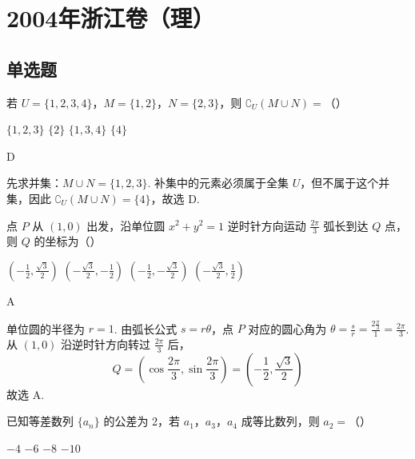 \chapter{2004年浙江卷（理）}
\section{单选题}
\begin{problem}
若 \(U=\{1,2,3,4\}\)，\(M=\{1,2\}\)，\(N=\{2,3\}\)，则 \(\complement_U(M\cup N)=\)（\quad）

\choices
    {\(\{1,2,3\}\)}
    {\(\{2\}\)}
    {\(\{1,3,4\}\)}
    {\(\{4\}\)}
\end{problem}

\begin{answer}
D
\end{answer}

\begin{solution}
先求并集：\(M\cup N=\{1,2,3\}\). 补集中的元素必须属于全集 \(U\)，但不属于这个并集，因此
\(\complement_U(M\cup N)=\{4\}\)，故选 D.
\end{solution}

\begin{problem}
点 \(P\) 从 \((1,0)\) 出发，沿单位圆 \(x^2+y^2=1\) 逆时针方向运动 \(\frac{2\pi}{3}\) 弧长到达 \(Q\) 点，则 \(Q\) 的坐标为（\quad）

\choices
    {\(\left(-\frac{1}{2}, \frac{\sqrt{3}}{2}\right)\)}
    {\(\left(-\frac{\sqrt{3}}{2}, -\frac{1}{2}\right)\)}
    {\(\left(-\frac{1}{2}, -\frac{\sqrt{3}}{2}\right)\)}
    {\(\left(-\frac{\sqrt{3}}{2}, \frac{1}{2}\right)\)}
\end{problem}

\begin{answer}
A
\end{answer}

\begin{solution}
单位圆的半径为 \(r=1\). 由弧长公式 \(s=r\theta\)，点 \(P\) 对应的圆心角为
\(\theta=\frac{s}{r}=\frac{2\frac{\pi}{3}}{1}=\frac{2\pi}{3}\). 从 \((1,0)\) 沿逆时针方向转过 \(\frac{2\pi}{3}\) 后，
\[
Q=\left(\cos\frac{2\pi}{3},\sin\frac{2\pi}{3}\right)=\left(-\frac{1}{2},\frac{\sqrt{3}}{2}\right)
\]
故选 A.
\end{solution}

\begin{problem}
已知等差数列 \(\{a_n\}\) 的公差为 2，若 \(a_1\)，\(a_3\)，\(a_4\) 成等比数列，则 \(a_2=\)（\quad）

\choices
    {\(-4\)}
    {\(-6\)}
    {\(-8\)}
    {\(-10\)}
\end{problem}

